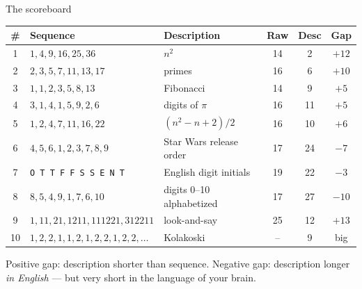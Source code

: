 \documentclass[aspectratio=169, 12pt, xcolor={dvipsnames}]{beamer}
\begin{document}
\begin{frame}{The scoreboard}
\footnotesize
\begin{center}
\begin{tabular}{cllccc}
\toprule
\# & Sequence & Description & Raw & Desc & Gap \\
\midrule
1  & $1,4,9,16,25,36$                 & $n^2$                        & 14 &  2 & $+12$ \\
2  & $2,3,5,7,11,13,17$               & primes                       & 16 &  6 & $+10$ \\
3  & $1,1,2,3,5,8,13$                 & Fibonacci                    & 14 &  9 & $+5$  \\
4  & $3,1,4,1,5,9,2,6$                & digits of $\pi$              & 16 & 11 & $+5$  \\
5  & $1,2,4,7,11,16,22$               & $(n^2-n+2)/2$                & 16 & 10 & $+6$  \\
6  & $4,5,6,1,2,3,7,8,9$              & Star Wars release order      & 17 & 24 & $-7$  \\
7  & \texttt{O T T F F S S E N T}     & English digit initials       & 19 & 22 & $-3$  \\
8  & $8,5,4,9,1,7,6,10$               & digits 0--10 alphabetized    & 17 & 27 & $-10$ \\
9  & $1,11,21,1211,111221,312211$     & look-and-say                 & 25 & 12 & $+13$ \\
10 & $1,2,2,1,1,2,1,2,2,1,2,2,\ldots$ & Kolakoski                    & -- &  9 & big   \\
\bottomrule
\end{tabular}
\end{center}
\vfill
\small\textcolor{hint}{Positive gap: description shorter than sequence.
Negative gap: description longer \emph{in English} --- but very short in the language of your brain.}
\end{frame}
\end{document}
